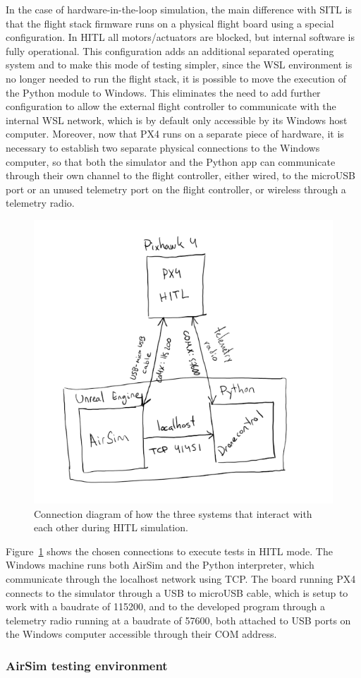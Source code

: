 In the case of hardware-in-the-loop simulation, the main difference with SITL is that the flight stack firmware runs on a physical flight board using a special configuration.
In HITL all motors/actuators are blocked, but internal software is fully operational.
This configuration adds an additional separated operating system and to make this mode of testing simpler, since the WSL environment is no longer needed to run the flight stack, it is possible to move the execution of the Python module to Windows.
This eliminates the need to add further configuration to allow the external flight controller to communicate with the internal WSL network, which is by default only accessible by its Windows host computer.
Moreover, now that PX4 runs on a separate piece of hardware, it is necessary to establish two separate physical connections to the Windows computer, so that both the simulator and the Python app can communicate through their own channel to the flight controller, either wired, to the microUSB port or an unused telemetry port on the flight controller, or wireless through a telemetry radio.

\begin{figure}
  \centering
  \includegraphics[scale=0.8,keepaspectratio]{img/hitl-connections.png}
  \caption{Connection diagram of how the three systems that interact with each other during HITL simulation.}\label{fig:hitl-connections}
\end{figure}
Figure~\ref{fig:hitl-connections} shows the chosen connections to execute tests in HITL mode.
The Windows machine runs both AirSim and the Python interpreter, which communicate through the localhost network using TCP.
The board running PX4 connects to the simulator through a USB to microUSB cable, which is setup to work with a baudrate of 115200, and to the developed program through a telemetry radio running at a baudrate of 57600, both attached to USB ports on the Windows computer accessible through their COM address.

\subsubsection{AirSim testing environment}
